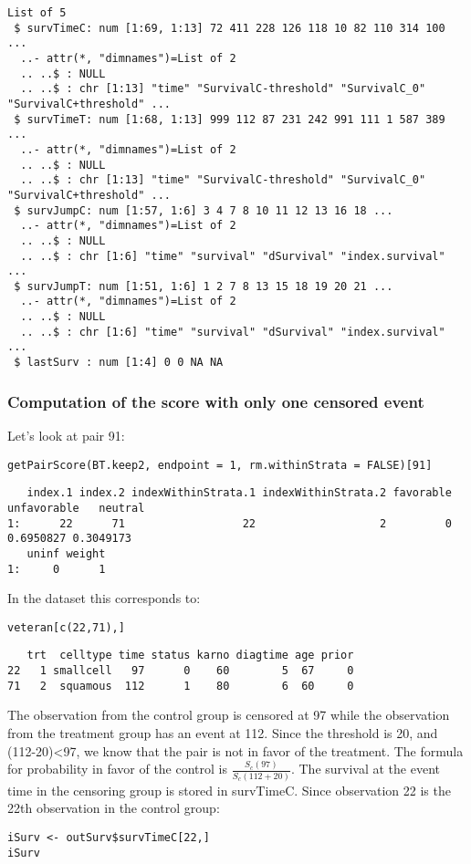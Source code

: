 \documentclass[12pt]{article}
\begin{document}
\begin{verbatim}
List of 5
 $ survTimeC: num [1:69, 1:13] 72 411 228 126 118 10 82 110 314 100 ...
  ..- attr(*, "dimnames")=List of 2
  .. ..$ : NULL
  .. ..$ : chr [1:13] "time" "SurvivalC-threshold" "SurvivalC_0" "SurvivalC+threshold" ...
 $ survTimeT: num [1:68, 1:13] 999 112 87 231 242 991 111 1 587 389 ...
  ..- attr(*, "dimnames")=List of 2
  .. ..$ : NULL
  .. ..$ : chr [1:13] "time" "SurvivalC-threshold" "SurvivalC_0" "SurvivalC+threshold" ...
 $ survJumpC: num [1:57, 1:6] 3 4 7 8 10 11 12 13 16 18 ...
  ..- attr(*, "dimnames")=List of 2
  .. ..$ : NULL
  .. ..$ : chr [1:6] "time" "survival" "dSurvival" "index.survival" ...
 $ survJumpT: num [1:51, 1:6] 1 2 7 8 13 15 18 19 20 21 ...
  ..- attr(*, "dimnames")=List of 2
  .. ..$ : NULL
  .. ..$ : chr [1:6] "time" "survival" "dSurvival" "index.survival" ...
 $ lastSurv : num [1:4] 0 0 NA NA
\end{verbatim}

\subsubsection{Computation of the score with only one censored event}
\label{sec:orgbc0d1ce}

Let's look at pair 91:
\lstset{language=r,label= ,caption= ,captionpos=b,numbers=none}
\begin{lstlisting}
getPairScore(BT.keep2, endpoint = 1, rm.withinStrata = FALSE)[91]
\end{lstlisting}

\begin{verbatim}
   index.1 index.2 indexWithinStrata.1 indexWithinStrata.2 favorable unfavorable   neutral
1:      22      71                  22                   2         0   0.6950827 0.3049173
   uninf weight
1:     0      1
\end{verbatim}

In the dataset this corresponds to:
\lstset{language=r,label= ,caption= ,captionpos=b,numbers=none}
\begin{lstlisting}
veteran[c(22,71),]
\end{lstlisting}

\begin{verbatim}
   trt  celltype time status karno diagtime age prior
22   1 smallcell   97      0    60        5  67     0
71   2  squamous  112      1    80        6  60     0
\end{verbatim}

The observation from the control group is censored at 97 while the
observation from the treatment group has an event at 112. Since the
threshold is 20, and (112-20)<97, we know that the pair is not in
favor of the treatment. The formula for probability in favor of the
control is \(\frac{S_c(97)}{S_c(112+20)}\). The survival at the event
time in the censoring group is stored in survTimeC. Since observation
22 is the 22th observation in the control group:
\lstset{language=r,label= ,caption= ,captionpos=b,numbers=none}
\begin{lstlisting}
iSurv <- outSurv$survTimeC[22,] 
iSurv
\end{lstlisting}
\end{document}
